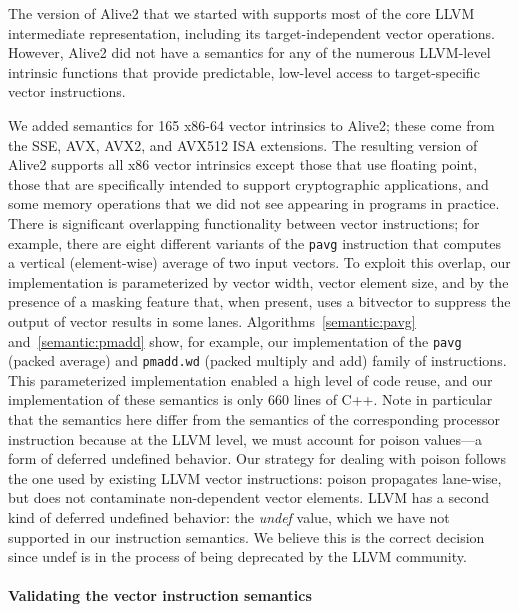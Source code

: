 The version of Alive2 that we started with supports most of the core
LLVM intermediate representation, including its target-independent
vector operations.
%
However, Alive2 did not have a semantics for any of the numerous
LLVM-level intrinsic functions that provide predictable, low-level
access to target-specific vector instructions.


We added semantics for 165 x86-64 vector intrinsics to Alive2; these
come from the SSE, AVX, AVX2, and AVX512 ISA extensions.
%
The resulting version of Alive2 supports all x86 vector intrinsics
except those that use floating point, those that are specifically
intended to support cryptographic applications, and some memory
operations that we did not see appearing in programs in practice.
%
There is significant overlapping functionality between vector
instructions; for example, there are eight different variants of the
\texttt{pavg} instruction that computes a vertical (element-wise)
average of two input vectors.
%
To exploit this overlap, our implementation is parameterized by vector
width, vector element size, and by the presence of a masking feature
that, when present, uses a bitvector to suppress the output of vector
results in some lanes.
%
Algorithms~\ref{semantic:pavg} and~\ref{semantic:pmadd} show, for
example, our implementation of the \texttt{pavg} (packed average) and
\texttt{pmadd.wd} (packed multiply and add) family of instructions.
%
This parameterized implementation enabled a high level of code reuse,
and our implementation of these semantics is only 660 lines of C++.
%
Note in particular that the semantics here differ from the semantics of
the corresponding processor instruction because at the LLVM level, we
must account for poison values---a form of deferred undefined
behavior.
%
Our strategy for dealing with poison follows the one used by existing
LLVM vector instructions: poison propagates lane-wise, but does not
contaminate non-dependent vector elements.
%
LLVM has a second kind of deferred undefined behavior: the
\emph{undef} value, which we have not supported in our instruction
semantics.
%
We believe this is the correct decision since undef is in the process
of being deprecated by the LLVM community.


\paragraph{Validating the vector instruction semantics}

